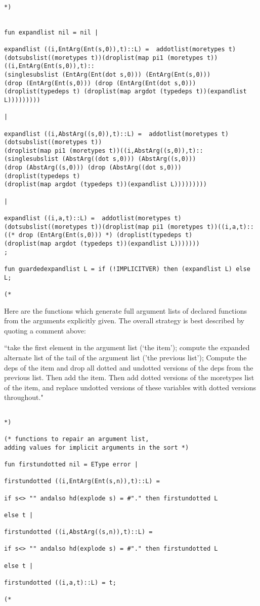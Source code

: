 \documentclass{article}
\begin{document}
\begin{verbatim}

*)


fun expandlist nil = nil |

expandlist ((i,EntArg(Ent(s,0)),t)::L) =  addotlist(moretypes t)
(dotsubslist((moretypes t))(droplist(map pi1 (moretypes t))((i,EntArg(Ent(s,0)),t)::
(singlesubslist (EntArg(Ent(dot s,0))) (EntArg(Ent(s,0))) 
(drop (EntArg(Ent(s,0))) (drop (EntArg(Ent(dot s,0))) 
(droplist(typedeps t) (droplist(map argdot (typedeps t))(expandlist L)))))))))

|

expandlist ((i,AbstArg((s,0)),t)::L) =  addotlist(moretypes t)
(dotsubslist((moretypes t))
(droplist(map pi1 (moretypes t))((i,AbstArg((s,0)),t)::
(singlesubslist (AbstArg((dot s,0))) (AbstArg((s,0))) 
(drop (AbstArg((s,0))) (drop (AbstArg((dot s,0))) 
(droplist(typedeps t) 
(droplist(map argdot (typedeps t))(expandlist L)))))))))

|

expandlist ((i,a,t)::L) =  addotlist(moretypes t)
(dotsubslist((moretypes t))(droplist(map pi1 (moretypes t))((i,a,t)::
((* drop (EntArg(Ent(s,0))) *) (droplist(typedeps t) 
(droplist(map argdot (typedeps t))(expandlist L)))))))
;

fun guardedexpandlist L = if (!IMPLICITVER) then (expandlist L) else L;

(*

\end{verbatim}

Here are the functions which generate full argument lists of declared functions from the arguments explicitly given.  The overall strategy is best described by quoting a comment above:

``take the first element in the argument list (`the item');
compute the expanded alternate list of the tail of the argument list ('the previous list');  Compute the deps of the item
and drop all dotted and undotted versions of the deps from the previous list.
Then add the item.  Then add dotted versions of the moretypes list of the item, and replace
undotted versions of these variables with dotted versions throughout."

\begin{verbatim}

*)

(* functions to repair an argument list, 
adding values for implicit arguments in the sort *)

fun firstundotted nil = EType error |

firstundotted ((i,EntArg(Ent(s,n)),t)::L) =

if s<> "" andalso hd(explode s) = #"." then firstundotted L

else t |

firstundotted ((i,AbstArg((s,n)),t)::L) =

if s<> "" andalso hd(explode s) = #"." then firstundotted L

else t |

firstundotted ((i,a,t)::L) = t;

(*
\end{verbatim}
\end{document}
